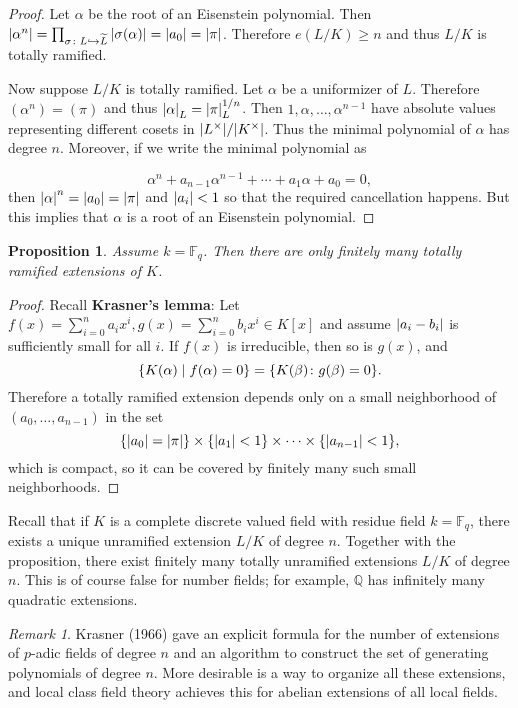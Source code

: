 \documentclass[leqno, openany]{memoir}
\newtheorem{prop}[thm]{Proposition}
\theoremstyle{definition}
\theoremstyle{remark}
\newtheorem{rmk}[thm]{Remark}
\theoremstyle{plain}
\theoremstyle{definition}
\theoremstyle{remark}
\newcommand{\F}{\mathbb{F}}
\newcommand{\Q}{\mathbb{Q}}
\newcommand{\wt}[1]{\widetilde{#1}}
\begin{document}
\begin{proof}
    Let $\alpha$ be the root of an Eisenstein polynomial. Then $\abs{\alpha^n} = \prod_{\sigma \colon L \hookrightarrow \wt{L}} \abs{\sigma(\alpha)} = \abs{a_0} = \abs{\pi}$. Therefore $e(L/K) \geq n$ and thus $L/K$ is totally ramified.

    Now suppose $L/K$ is totally ramified. Let $\alpha$ be a uniformizer of $L$. Therefore $(\alpha^n) = (\pi)$ and thus $\abs{\alpha}_L = \abs{\pi}_L^{1/n}$. Then $1, \alpha, \ldots, \alpha^{n-1}$ have absolute values representing different cosets in $\abs{L^{\times}} / \abs{K^{\times}}$. Thus the minimal polynomial of $\alpha$ has degree $n$. Moreover, if we write the minimal polynomial as

    \[ \alpha^n + a_{n-1} \alpha^{n-1} + \cdots + a_1 \alpha + a_0 = 0, \]
    then $\abs{\alpha}^n = \abs{a_0} = \abs{\pi}$ and $\abs{a_i} < 1$ so that the required cancellation happens. But this implies that $\alpha$ is a root of an Eisenstein polynomial.
\end{proof}

\begin{prop}
    Assume $k = \F_q$. Then there are only finitely many totally ramified extensions of $K$.
\end{prop}

\begin{proof}
    Recall \textbf{Krasner's lemma}: Let $f(x) = \sum_{i=0}^n a_i x^i, g(x) = \sum_{i=0}^n b_i x^i \in K[x]$ and assume $\abs{a_i - b_i}$ is sufficiently small for all $i$. If $f(x)$ is irreducible, then so is $g(x)$, and 
    \[ \qty{K(\alpha) \mid f(\alpha) = 0} = \qty{K(\beta) \colon g(\beta) = 0}. \]
    Therefore a totally ramified extension depends only on a small neighborhood of $(a_0, \ldots, a_{n-1})$ in the set
    \[ \qty{\abs{a_0} = \abs{\pi}} \times \qty{\abs{a_1} < 1} \times \cdots \times \qty{\abs{a_{n-1}} < 1}, \]
    which is compact, so it can be covered by finitely many such small neighborhoods.
\end{proof}

Recall that if $K$ is a complete discrete valued field with residue field $k = \F_q$, there exists a unique unramified extension $L/K$ of degree $n$. Together with the proposition, there exist finitely many totally unramified extensions $L/K$ of degree $n$. This is of course false for number fields; for example, $\Q$ has infinitely many quadratic extensions.

\begin{rmk}
    Krasner (1966) gave an explicit formula for the number of extensions of $p$-adic fields of degree $n$ and an algorithm to construct the set of generating polynomials of degree $n$. More desirable is a way to organize all these extensions, and local class field theory achieves this for abelian extensions of all local fields.
\end{rmk}
\end{document}
